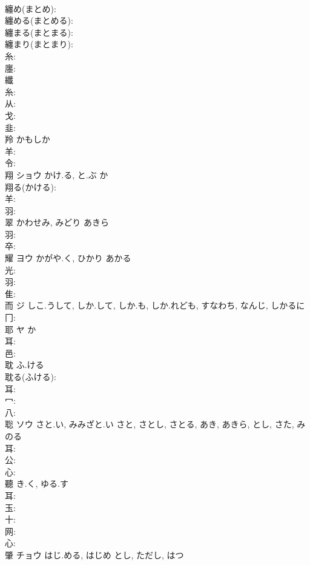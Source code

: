 \documentclass[8pt]{extreport}
\begin{document}
\begin{CJK}{UTF8}{min}
\\	纏め(まとめ): 
\\	纏める(まとめる): 
\\	纏まる(まとまる): 
\\	纏まり(まとまり): 
\\	糸: 
\\	廛: 
\\	纖						
\\	糸: 
\\	从: 
\\	戈: 
\\	韭: 
\\	羚		かもしか				
\\	羊: 
\\	令: 
\\	翔	ショウ	かけ.る, と.ぶ	か	
\\	翔る(かける): 
\\	羊: 
\\	羽: 
\\	翠		かわせみ, みどり	あきら		
\\	羽: 
\\	卒: 
\\	耀	ヨウ	かがや.く, ひかり	あかる	
\\	光: 
\\	羽: 
\\	隹: 
\\	而	ジ	しこ.うして, しか.して, しか.も, しか.れども, すなわち, なんじ, しかるに		
\\	冂: 
\\	耶	ヤ	か		
\\	耳: 
\\	邑: 
\\	耽		ふ.ける			
\\	耽る(ふける): 
\\	耳: 
\\	冖: 
\\	八: 
\\	聡	ソウ	さと.い, みみざと.い	さと, さとし, さとる, あき, あきら, とし, さた, みのる	
\\	耳: 
\\	公: 
\\	心: 
\\	聽		き.く, ゆる.す				
\\	耳: 
\\	玉: 
\\	十: 
\\	网: 
\\	心: 
\\	肇	チョウ	はじ.める, はじめ	とし, ただし, はつ	

\end{CJK}
\end{document}
